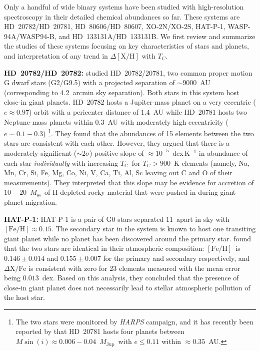 \documentclass[modern, letterpaper]{aastex61}
\newcommand{\project}[1]{\textsl{#1}}
\newcommand*\elem[1]{\ensuremath{\mathrm{#1}}}
\newcommand*\elemH[1]{\ensuremath{[\mathrm{#1}/\elem{H}]}}
\newcommand*{\feh}{\ensuremath{\elemH{Fe}}}
\newcommand{\Tcondens}{\ensuremath{T_C}}
\newcommand{\mearth}{\ensuremath{M_\oplus}}
\newcommand{\mjupiter}{\ensuremath{M_\mathrm{Jup}}}
\begin{document}
Only a handful of wide binary systems have been studied with high-resolution
spectroscopy in their detailed chemical abundances so far.
These systems are HD~20782/HD~20781, HD~80606/HD~80607, XO-2N/XO-2S, HAT-P-1,
WASP-94A/WASP94-B, and HD~133131A/HD~133131B.
We first review and summarize the studies of these systems focusing on key
characteristics of stars and planets, and interpretation of any trend in
$\Delta\elemH{X}$ with \Tcondens.

{\bf HD~20782/HD~20782:}
\citealt{Mack:2014aa} studied HD~20782/20781, two common proper motion G dwarf
stars (G2/G9.5) with a projected separation of $\sim9000$~AU (corresponding to
4.2~arcmin sky separation). Both stars in this system host close-in giant
planets.
HD~20782 hosts a Jupiter-mass planet on a very eccentric ($e\approx 0.97$)
orbit with a pericenter distance of 1.4~AU while HD~20781 hosts two
Neptune-mass planets within 0.3~AU with moderately high eccentricity
($e\sim0.1-0.3$) \footnote{
  The two stars were monitored by \project{HARPS}
  campaign, and it has recently been reported by \citealt{todo} that HD~20781 hosts
  four planets between $M\sin(i)\approx 0.006-0.04$~\mjupiter\ with $e \le
  0.11$ within $\approx 0.35$~AU.}.
They found that the abundances of 15 elements between the two stars are
consistent with each other.
However, they argued that there is a moderately significant ($\sim 2\sigma$)
positive slope of $\approx 10^{-5}$~dex\,K$^{-1}$ in abundance of each star
{\it individually} with increasing \Tcondens\ for $\Tcondens>900$~K elements
(namely, Na, Mn, Cr, Si, Fe, Mg, Co, Ni, V, Ca, Ti, Al, Sc leaving out C and O
of their measurements).
They interpreted that this slope may be evidence for accretion of
$10-20$~\mearth\ of H-depleted rocky material that were pushed in during giant
planet migration.

{\bf HAT-P-1:}
HAT-P-1 is a pair of G0 stars separated 11\arcsec\ apart in sky
with $\feh\approx0.15$.
The secondary star in the system is known to host one transiting giant planet
while no planet has been discovered around the primary star.
\citealt{Liu:2014aa} found that the two stars are identical in their
atmospheric composition: \feh\ is $0.146 \pm 0.014$ and $0.155 \pm 0.007$ for
the primary and secondary respectively, and $\Delta\elem{X}/\elem{Fe}$ is
consistent with zero for 23 elements measured with the mean error being
$0.013$~dex.
Based on this analysis, they concluded that the presence of close-in giant planet
does not necessarily lead to stellar atmospheric pollution of the host star.
\end{document}
